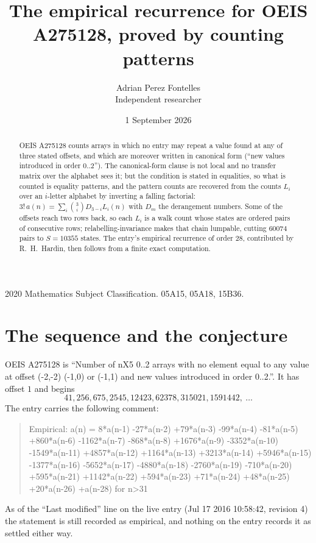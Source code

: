 \documentclass[11pt,a4paper]{article}
\title{The empirical recurrence for OEIS A275128, proved by counting patterns}
\author{Adrian Perez Fontelles\\ \small Independent researcher}
\date{1 September 2026}
\theoremstyle{plain}
\theoremstyle{definition}
\begin{document}
\maketitle

\begin{abstract}
OEIS A275128 counts arrays in which no entry may repeat a value found at any of three stated
offsets, and which are moreover written in canonical form (``new values introduced in order
$0..2$''). The canonical-form clause is not local and no transfer matrix over the
alphabet sees it; but the condition is stated in equalities, so what is counted is equality
patterns, and the pattern counts are recovered from the counts $L_i$ over an $i$-letter
alphabet by inverting a falling factorial:
$3!\,a(n)=\sum_i\binom{3}{i}D_{3-i}L_i(n)$ with $D_m$ the derangement numbers.
Some of the offsets reach two rows back, so each $L_i$ is a walk count whose states are
ordered pairs of consecutive rows; relabelling-invariance makes that chain lumpable,
cutting $60074$ pairs to $S=10355$ states. The entry's empirical recurrence of order $28$,
contributed by R.~H.~Hardin, then follows from a finite exact computation.
\end{abstract}

\noindent\small 2020 Mathematics Subject Classification. 05A15, 05A18, 15B36.\normalsize

\section{The sequence and the conjecture}

OEIS A275128 is ``Number of nX5 0..2 arrays with no element equal to any value at offset (-2,-2) (-1,0) or (-1,1) and new values introduced in order 0..2.''. It has offset $1$ and begins
\[
41, 256, 675, 2545, 12423, 62378, 315021, 1591442,\ \dots
\]
The entry carries the following comment:
\begin{quote}\small
Empirical: a(n) = 8*a(n-1) -27*a(n-2) +79*a(n-3) -99*a(n-4) -81*a(n-5) +860*a(n-6) -1162*a(n-7) -868*a(n-8) +1676*a(n-9) -3352*a(n-10) -1549*a(n-11) +4857*a(n-12) +1164*a(n-13) +3213*a(n-14) +5946*a(n-15) -1377*a(n-16) -5652*a(n-17) -4880*a(n-18) -2760*a(n-19) -710*a(n-20) +595*a(n-21) +1142*a(n-22) +594*a(n-23) +71*a(n-24) +48*a(n-25) +20*a(n-26) +a(n-28) for n>31
\end{quote}
As of the ``Last modified'' line on the live entry (Jul 17 2016 10:58:42, revision 4) the statement is
still recorded as empirical, and nothing on the entry records it as settled either way.
\end{document}
